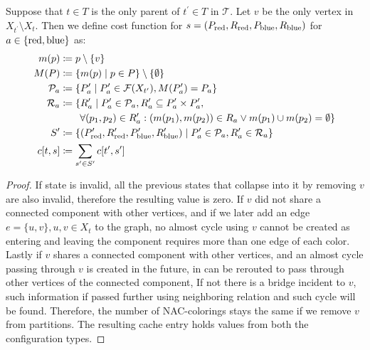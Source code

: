 Suppose that \( t \in T \) is
the only parent of \( t^\prime \in T \) in \( \mathcal {T} \).
Let \( v \) be the only vertex in \( X_{t^\prime} \setminus X_t \).
Then we define cost function for \( s=(P_{\text{red}}, R_{\text{red}}, P_{\text{blue}}, R_{\text{blue}}) \)
for \( a \in \{\text{red}, \text{blue}\} \) as:
%
\begin{align}
	m(p)          & \coloneqq p \setminus \{v\}   \notag                                                                                                                    \\
	M(P)          & \coloneqq \{m(p) \mid p \in P \} \setminus \{\emptyset\}   \notag                                                                                       \\
	\mathcal{P}_a & \coloneqq \{ P_a^\prime \mid P_a^\prime \in \mathcal{F}(X_{t^\prime}), M(P_a^\prime) = P_a \}   \notag                                                  \\
	\mathcal{R}_a & \coloneqq \{ R_a^\prime \mid P_a^\prime \in \mathcal{P}_a, R_a^\prime \subseteq P_a^\prime \times P_a^\prime,   \notag                                  \\
	              & \qquad \forall (p_1, p_2) \in R_a^\prime : (m(p_1), m(p_2)) \in R_a \lor m(p_1) \cup m(p_2) = \emptyset \}   \notag                                     \\
	S^\prime      & \coloneqq \{(P_{\text{red}}^\prime, R_{\text{red}}^\prime, P_{\text{blue}}^\prime, R_{\text{blue}}^\prime) \mid P_a^\prime \in \mathcal{P}_a, R_a^\prime \in \mathcal{R}_a  \}   \notag \\
	c[t, s]       & \coloneqq \sum_{s^\prime \in S^\prime} c[t^\prime, s^\prime]
\end{align}
%
%
\begin{proof}
	If state is invalid, all the previous states that collapse into it by removing \( v \)
	are also invalid, therefore the resulting value is zero.
	If \( v \) did not share a connected component with other vertices,
	and if we later add an edge \( e = \{u, v\}, u, v \in X_t \) to the graph,
	no almost cycle using \( v \) cannot be created as entering and leaving the component
	requires more than one edge of each color.
	Lastly if \( v \) shares a connected component with other vertices,
	and an almost cycle passing through \( v \) is created in the future,
	in can be rerouted to pass through other vertices of the connected component,
	If not there is a bridge incident to \( v \), such information if passed
	further using neighboring relation and such cycle will be found.
	Therefore, the number of NAC-colorings stays the same if we remove \( v \)
	from  partitions.
	The resulting cache entry holds values from both the configuration types.
\end{proof}
%

